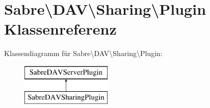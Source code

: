 \hypertarget{class_sabre_1_1_d_a_v_1_1_sharing_1_1_plugin}{}\section{Sabre\textbackslash{}D\+AV\textbackslash{}Sharing\textbackslash{}Plugin Klassenreferenz}
\label{class_sabre_1_1_d_a_v_1_1_sharing_1_1_plugin}
Klassendiagramm für Sabre\textbackslash{}D\+AV\textbackslash{}Sharing\textbackslash{}Plugin\+:\begin{figure}[H]
\begin{center}
\leavevmode
\includegraphics[height=2.000000cm]{class_sabre_1_1_d_a_v_1_1_sharing_1_1_plugin}
\end{center}
\end{figure}
